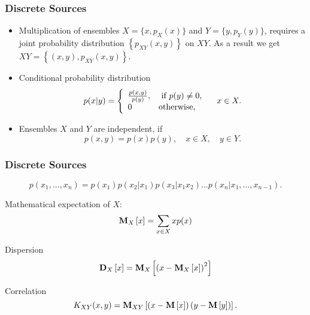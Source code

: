 \documentclass[14pt]{beamer}
\begin{document}
\begin{frame}
\frametitle{Discrete Sources}
\begin{itemize}

    \item Multiplication of ensembles $X= \{x,p_X (x)\}$ and $Y = \{y,p_Y (y)\}$, requires a joint probability distribution $\left\{ {p_{XY} (x,y)} \right\}$ on $XY$. As a result we get $XY = \left\{{(x,y),p_{XY}(x,y)} \right\}$.
    
    \item Conditional probability distribution
    \[
    p(x\vert y) = \left\{ {{\begin{array}{*{20}c}
     {\frac{p(x,y)}{p(y)},} \hfill & {\mbox{ if }p(y) \ne 0,} \hfill \\
     0 \hfill & {\mbox{otherwise,}} \hfill \\
    \end{array} }} \right.
    \quad
    x \in X.
    \]
    
    \item Ensembles $X$ and $Y$ are independent, if
    \[
    p(x,y) = p(x)p(y),
    \quad
    x \in X,
    \quad
    y \in Y.
    \]    
\end{itemize}
\end{frame}



\begin{frame}
\frametitle{Discrete Sources}
\begin{itemize}
\small{

    \item 
    \[
    p(x_1 ,...,x_n ) = p(x_1 )p(x_2 \vert x_1 )p(x_3 \vert x_1 x_2 ) ... p(x_n \vert x_1 ,...,x_{n - 1} ).
    \]

    \item Mathematical expectation of $X$:
    \[
    {\rm {\bf M}}_X \left[ x \right] = \sum\limits_{x \in X} {xp(x)}
    \]
    
    \item Dispersion
    \[
    {\rm {\bf D}}_X \left[ x \right] = {\rm {\bf M}}_X \left[ {\left( {x - {\rm
    {\bf M}}_X \left[ x \right]} \right)^2} \right]
    \]
    
    \item Correlation
    \[
    K_{XY} (x,y) = {\rm {\bf M}}_{XY} \left[ {\left( {x - {\rm {\bf M}}\left[ x
    \right]} \right)\left( {y - {\rm {\bf M}}\left[ y \right]} \right)}
    \right].
    \]
} 
\end{itemize}
\end{frame}
\end{document}
